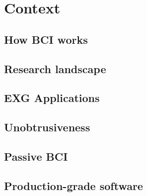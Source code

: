 \chapter{Context}
\graphicspath{{Chapter2/Figs/}{Chapter2/Figs/}}

\section{How BCI works}
\label{chapter2-how-bci-works}


\section{Research landscape}
\label{chapter2-landscape}


\section{EXG Applications}
\label{chapter2-exg-applications}


\section{Unobtrusiveness}
\label{chapter2-unobtrusiveness}


\section{Passive BCI}
\label{chapter2-passive-bci}


\section{Production-grade software}
\label{chapter2-production-grade-software}


